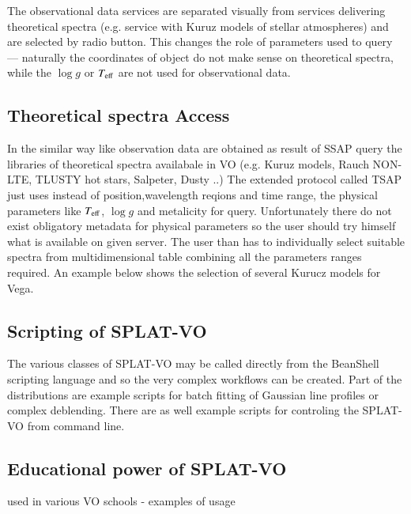 \documentclass[final,authoryear,5p,times,twocolumn]{elsarticle}
\begin{document}
The observational data services are separated visually from services
delivering theoretical spectra (e.g. service with  Kuruz models of stellar
atmospheres) and are selected by radio button. This changes the role of
parameters used to query --- naturally the coordinates of object do not make
sense on theoretical spectra, while the $\log g$ or $T_{\rm eff}$ are not used for
observational data.


\subsection{ Theoretical spectra Access}

In the similar way like observation data are obtained as result of SSAP query
the libraries of theoretical spectra availabale in VO (e.g. Kuruz models, Rauch
NON-LTE, TLUSTY hot stars, Salpeter, Dusty ..) The extended protocol called
TSAP \cite{ssap} just uses instead of position,wavelength reqions and time range, the
physical parameters like $T_{\rm eff}$, $\log g$ and  metalicity for query. Unfortunately
there do not exist obligatory metadata for physical parameters so the user
should try himself what is available on given server. The user than has to
individually select suitable spectra from  multidimensional  table combining
all the parameters ranges required.  An example below shows the selection of several Kurucz models
for Vega.





\subsection{Scripting of SPLAT-VO}   

The various classes of SPLAT-VO may be called directly from the 
BeanShell scripting language \citep{niemeyer2013learning} and so the very complex workflows can be created.
Part of the distributions are example scripts for batch fitting of Gaussian line
profiles or complex deblending. There are as well example scripts for
controling the SPLAT-VO from command line.


\subsection{Educational power of SPLAT-VO}

used in various VO schools - examples of usage



\end{document}
